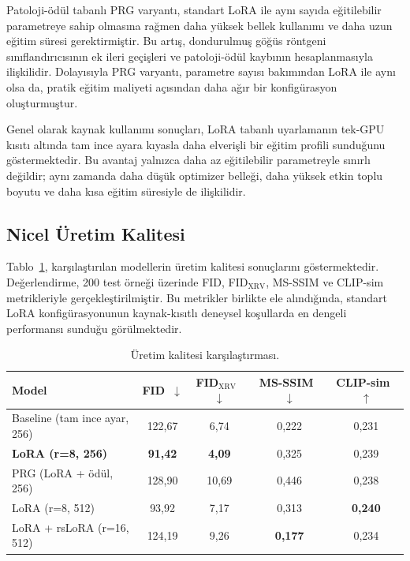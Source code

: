 \documentclass[11pt]{article}
\begin{document}
Patoloji-ödül tabanlı PRG varyantı, standart LoRA ile aynı sayıda eğitilebilir
parametreye sahip olmasına rağmen daha yüksek bellek kullanımı ve daha uzun
eğitim süresi gerektirmiştir. Bu artış, dondurulmuş göğüs röntgeni
sınıflandırıcısının ek ileri geçişleri ve patoloji-ödül kaybının hesaplanmasıyla
ilişkilidir. Dolayısıyla PRG varyantı, parametre sayısı bakımından LoRA ile aynı
olsa da, pratik eğitim maliyeti açısından daha ağır bir konfigürasyon
oluşturmuştur.

Genel olarak kaynak kullanımı sonuçları, LoRA tabanlı uyarlamanın tek-GPU
kısıtı altında tam ince ayara kıyasla daha elverişli bir eğitim profili sunduğunu
göstermektedir. Bu avantaj yalnızca daha az eğitilebilir parametreyle sınırlı
değildir; aynı zamanda daha düşük optimizer belleği, daha yüksek etkin toplu
boyutu ve daha kısa eğitim süresiyle de ilişkilidir.

\subsection{Nicel Üretim Kalitesi}

Tablo~\ref{tab:quality}, karşılaştırılan modellerin üretim kalitesi sonuçlarını
göstermektedir. Değerlendirme, 200 test örneği üzerinde FID,
FID$_{\text{XRV}}$, MS-SSIM ve CLIP-sim metrikleriyle gerçekleştirilmiştir.
Bu metrikler birlikte ele alındığında, standart LoRA konfigürasyonunun
kaynak-kısıtlı deneysel koşullarda en dengeli performansı sunduğu görülmektedir.

\begin{table}[htbp]
\centering
\caption{Üretim kalitesi karşılaştırması.}
\label{tab:quality}
\small
\begin{tabular}{@{}lcccc@{}}
\toprule
\textbf{Model} & \textbf{FID}~$\downarrow$ & \textbf{FID$_{\text{XRV}}$}~$\downarrow$
& \textbf{MS-SSIM}~$\downarrow$ & \textbf{CLIP-sim}~$\uparrow$ \\
\midrule
Baseline (tam ince ayar, 256) & 122,67 & 6,74  & 0,222 & 0,231 \\
\textbf{LoRA (r=8, 256)}      & \textbf{91,42} & \textbf{4,09} & 0,325 & 0,239 \\
PRG (LoRA + ödül, 256)        & 128,90 & 10,69 & 0,446 & 0,238 \\
LoRA (r=8, 512)               & 93,92  & 7,17  & 0,313 & \textbf{0,240} \\
LoRA + rsLoRA (r=16, 512)     & 124,19 & 9,26  & \textbf{0,177} & 0,234 \\
\bottomrule
\end{tabular}
\end{table}
\end{document}

